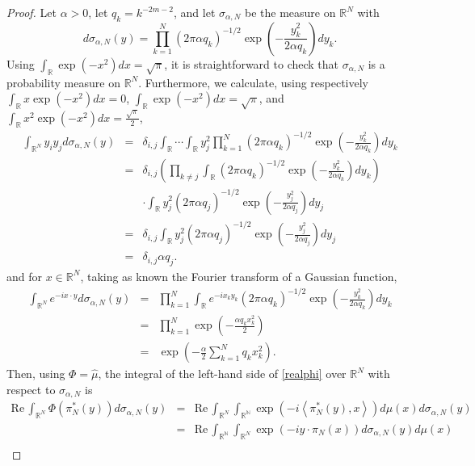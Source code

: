 \documentclass{article}
\newcommand{\inner}[2]{\left\langle #1, #2 \right\rangle}
\def\Re{\ensuremath{\mathrm{Re}}\,}
\theoremstyle{definition}
\theoremstyle{definition}
\begin{document}
\begin{proof}
Let $\alpha>0$, 
let $q_k=k^{-2m-2}$, and let $\sigma_{\alpha,N}$ be the measure on $\mathbb{R}^N$ with 
\[
d\sigma_{\alpha,N}(y) = \prod_{k=1}^N (2\pi \alpha q_k)^{-1/2} \exp\left(-\frac{y_k^2}{2\alpha q_k}\right) dy_k.
\]
Using $\int_{\mathbb{R}} \exp(-x^2) dx=\sqrt{\pi}$, it is straightforward to check that
$\sigma_{\alpha,N}$ is a probability measure on $\mathbb{R}^N$. Furthermore, we calculate, using respectively
$\int_{\mathbb{R}} x \exp(-x^2) dx=0$,
$\int_{\mathbb{R}} \exp(-x^2) dx=\sqrt{\pi}$, and $\int_{\mathbb{R}} x^2 \exp(-x^2) dx=\frac{\sqrt{\pi}}{2}$,
\begin{eqnarray*}
\int_{\mathbb{R}^N} y_i y_j d\sigma_{\alpha,N}(y)&=&\delta_{i,j} \int_{\mathbb{R}} \cdots \int_{\mathbb{R}} y_j^2 \prod_{k=1}^N (2\pi \alpha q_k)^{-1/2} \exp\left(-\frac{y_k^2}{2\alpha q_k}\right) dy_k\\
&=&\delta_{i,j} \left( \prod_{k \neq j} \int_{\mathbb{R}} (2\pi \alpha q_k)^{-1/2} \exp\left(-\frac{y_k^2}{2\alpha q_k}\right) dy_k \right)\\
&&\cdot \int_{\mathbb{R}} y_j^2 (2\pi \alpha q_j)^{-1/2} \exp\left(-\frac{y_j^2}{2\alpha q_j}\right) dy_j\\
&=&\delta_{i,j}\int_{\mathbb{R}} y_j^2 (2\pi \alpha q_j)^{-1/2} \exp\left(-\frac{y_j^2}{2\alpha q_j}\right) dy_j\\
&=&\delta_{i,j} \alpha q_j.
\end{eqnarray*}
and for $x \in \mathbb{R}^N$,  taking as known the Fourier transform of a Gaussian function,
\begin{eqnarray*}
\int_{\mathbb{R}^N} e^{-ix\cdot y} d\sigma_{\alpha,N}(y)&=&\prod_{k=1}^N \int_{\mathbb{R}} e^{-ix_ky_k} (2\pi \alpha q_k)^{-1/2} \exp\left(-\frac{y_k^2}{2\alpha q_k}\right) dy_k\\
&=&\prod_{k=1}^N \exp\left(-\frac{\alpha q_k x_k^2}{2}\right)\\
&=&\exp\left(-\frac{\alpha}{2} \sum_{k=1}^N q_k x_k^2 \right).
\end{eqnarray*}
Then, using $\Phi=\hat{\mu}$, the integral of the left-hand side of \eqref{realphi} over $\mathbb{R}^N$ with respect to $\sigma_{\alpha,N}$ is
\begin{eqnarray*}
\Re \int_{\mathbb{R}^N} \Phi(\pi_N^*(y)) d\sigma_{\alpha,N}(y)&=&\Re \int_{\mathbb{R}^N} \int_{\mathbb{R}^\mathbb{N}} \exp(-i\inner{\pi_N^*(y)}{x}) d\mu(x) d\sigma_{\alpha,N}(y)\\
&=&\Re \int_{\mathbb{R}^\mathbb{N}} \int_{\mathbb{R}^N} \exp(-i  y\cdot \pi_N(x)) d\sigma_{\alpha,N}(y) d\mu(x)\\

\end{eqnarray*}
\end{proof}
\end{document}
